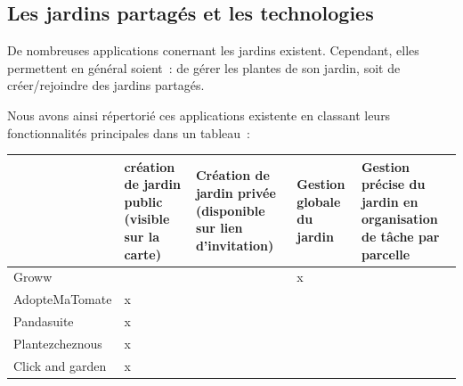 \documentclass[french,a4paper]{article}
\begin{document}
\subsection{Les jardins partagés et les technologies}
De nombreuses applications conernant les jardins existent. 
Cependant, elles permettent en général soient~: de gérer les plantes de son jardin, soit de créer/rejoindre des jardins partagés.

Nous avons ainsi répertorié ces applications existente en classant leurs fonctionnalités principales dans un tableau~:

\begin{center}
    \begin{tabular}{ |l| p{3cm} | p{3cm} | p{3cm} | p{3cm} | }
        \hline
                         & \raggedright création de jardin public (visible sur la carte) & \raggedright Création de jardin privée (disponible sur lien d’invitation) & \raggedright Gestion globale du jardin & Gestion précise du jardin en organisation de tâche par parcelle \\
        \hline
        Groww            &                                                              &                                                                            & x                                      &                                                                 \\
        \hline
        AdopteMaTomate   & x                                                            &                                                                            &                                        &                                                                 \\
        \hline
        Pandasuite       & x                                                            &                                                                            &                                        &                                                                 \\
        \hline
        Plantezcheznous  & x                                                            &                                                                            &                                        &                                                                 \\
        \hline
        Click and garden & x                                                            &                                                                            &                                        &                                                                 \\

        \hline
    \end{tabular}
\end{center}
\end{document}
